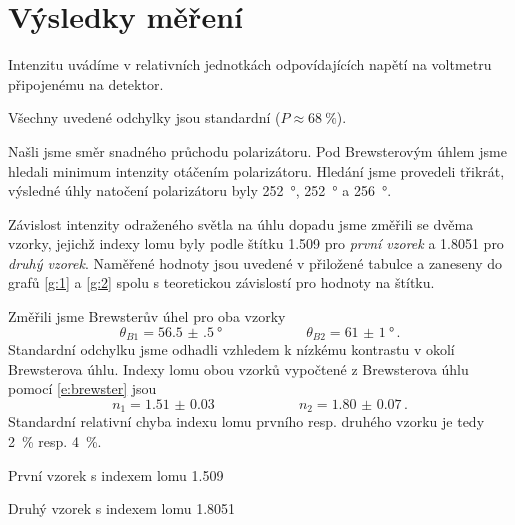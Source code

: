 \section*{Výsledky měření}
Intenzitu uvádíme v relativních jednotkách odpovídajících napětí na voltmetru připojenému na detektor.

Všechny uvedené odchylky jsou standardní ($P\approx\SI{68}{\percent}$).

Našli jsme směr snadného průchodu polarizátoru. Pod Brewsterovým úhlem jsme hledali minimum intenzity otáčením polarizátoru. Hledání jsme provedeli třikrát, výsledné úhly natočení polarizátoru byly \SI{252}{\degree}, \SI{252}{\degree} a \SI{256}{\degree}.

Závislost intenzity odraženého světla na úhlu dopadu jsme změřili se dvěma vzorky, jejichž indexy lomu byly podle štítku \num{1.509} pro \emph{první vzorek} a \num{1.8051} pro \emph{druhý vzorek}. Naměřené hodnoty jsou uvedené v přiložené tabulce a zaneseny do grafů \ref{g:1} a \ref{g:2} spolu s teoretickou závislostí pro hodnoty na štítku. 

Změřili jsme Brewsterův úhel pro oba vzorky
\begin{equation*}
\theta_{B1} = \SI{56.5(5)}{\degree} \qquad \qquad \qquad \theta_{B2} = \SI{61(1)}{\degree} \,.
\end{equation*}
Standardní odchylku jsme odhadli vzhledem k nízkému kontrastu v okolí Brewsterova úhlu.
Indexy lomu obou vzorků vypočtené z Brewsterova úhlu pomocí \eqref{e:brewster} jsou
\begin{equation*}
n_1 = \num{1.51(3)} \qquad \qquad \qquad n_2 = \num{1.80(7)} \,.
\end{equation*}
Standardní relativní chyba indexu lomu prvního resp. druhého vzorku je tedy \SI{2}{\percent} resp. \SI{4}{\percent}.

\begin{graph}[p] 
\centering

\caption{První vzorek s indexem lomu \num{1.509}}
\label{g:1}
\end{graph}


\begin{graph}[p] 
\centering

\caption{Druhý vzorek s indexem lomu \num{1.8051}}
\label{g:2}
\end{graph}